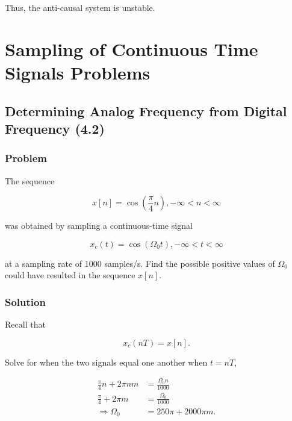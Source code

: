 Thus, the anti-causal system is unstable. 


\section{Sampling of Continuous Time Signals Problems}

\subsection{Determining Analog Frequency from Digital Frequency (4.2)}

\subsubsection{Problem}

The sequence

\begin{equation}
    x[n] = \cos \left( \frac{\pi}{4} n \right), -\infty < n < \infty
\end{equation}

was obtained by sampling a continuous-time signal

\begin{equation}
    x_c (t) = \cos(\Omega_0 t), -\infty < t < \infty
\end{equation}

at a sampling rate of 1000 samples/s. Find the possible positive values of $\Omega_0$ 
could have resulted in the sequence $x[n]$.

\subsubsection{Solution}

Recall that 

\begin{equation}
    x_c (nT) = x[n].
\end{equation}

Solve for when the two signals equal one another when $t=nT$,

\begin{equation}
    \begin{aligned}
        \frac{\pi }{4}n + 2\pi nm &= \frac{{{\Omega _0}n}}{{1000}}\\
        \frac{\pi }{4} + 2\pi m &= \frac{{{\Omega _0}}}{{1000}}\\
         \Rightarrow {\Omega _0} &= 250\pi  + 2000\pi m .
        \end{aligned}
\end{equation}


